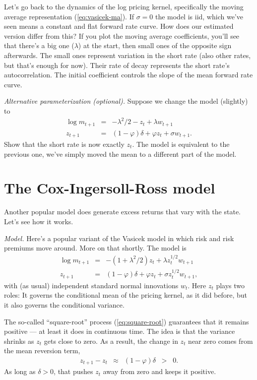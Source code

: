 \documentclass[11pt]{article}
\begin{document}
Let's go back to the dynamics of the log pricing kernel, 
specifically the moving average representation (\ref{eq:vasicek-ma}).  
If $\sigma = 0$ the model is iid, which we've seen means a 
constant and flat forward rate curve. 
How does our estimated version differ from this?  
If you plot the moving average coefficients, 
you'll see that there's a big one ($\lambda$) at the start, 
then small ones of the opposite sign afterwards.  
The small ones represent variation in the short rate 
(also other rates, but that's enough for now).  
Their rate of decay represents the short rate's autocorrelation.  
The initial coefficient controls the slope of the mean forward rate
curve.  


{\it Alternative parameterization (optional).\/}
Suppose we change the model (slightly) to
\begin{eqnarray*}
    \log m_{t+1} &=& - \lambda^2/2 - z_t + \lambda w_{t+1} \\
         z_{t+1} &=& (1-\varphi) \delta + \varphi z_t + \sigma w_{t+1} .
\end{eqnarray*}
Show that the short rate is now exactly $z_t$.
The model is equivalent to the previous one,
we've simply moved the mean to a different part of the model.


\section{The Cox-Ingersoll-Ross model}

Another popular model does generate excess returns that vary with the state.
Let's see how it works.

{\it Model.\/}
Here's a popular variant of the Vasicek model
in which risk and risk premiums move around.
More on that shortly.
The model is
\begin{eqnarray}
    \log m_{t+1} &=& - (1+\lambda^2/2 ) z_t + \lambda z_t^{1/2} w_{t+1} \nonumber \\
         z_{t+1} &=& (1-\varphi) \delta + \varphi z_t + \sigma z_t^{1/2} w_{t+1} ,
         \label{eq:square-root}
\end{eqnarray}
with (as usual) independent standard normal innovations $w_t$.
Here $z_t$ plays two roles:  It governs the conditional mean
of the pricing kernel, as it did before,
but it also governs the conditional variance.

The so-called ``square-root'' process (\ref{eq:square-root}) guarantees that
it remains positive --- at least it does in continuous time.
The idea is that the variance shrinks as $z_t$ gets close to zero.
As a result, the change in $z_t$ near zero comes from the mean reversion term,
\begin{eqnarray*}
       z_{t+1} - z_t  &\approx& (1-\varphi) \delta  \;\;>\;\; 0.
\end{eqnarray*}
As long as $\delta>0$, that pushes $z_t$ away from zero and keeps it positive.
\end{document}
